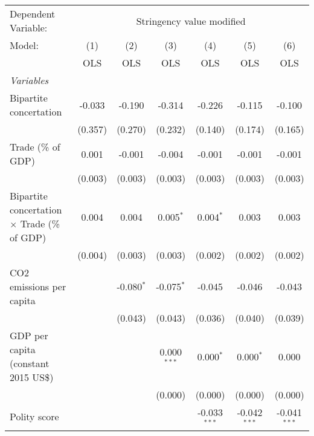 
\begingroup
\centering
\begin{tabular}{lcccccc}
   \toprule
   Dependent Variable: & \multicolumn{6}{c}{Stringency value modified}\\
   Model:                                              & (1)     & (2)          & (3)           & (4)            & (5)            & (6)\\  
                                                       &  OLS    & OLS          & OLS           & OLS            & OLS            & OLS\\  
   \midrule
   \emph{Variables}\\
   Bipartite concertation                              & -0.033  & -0.190       & -0.314        & -0.226         & -0.115         & -0.100\\   
                                                       & (0.357) & (0.270)      & (0.232)       & (0.140)        & (0.174)        & (0.165)\\   
   Trade (\% of GDP)                                   & 0.001   & -0.001       & -0.004        & -0.001         & -0.001         & -0.001\\   
                                                       & (0.003) & (0.003)      & (0.003)       & (0.003)        & (0.003)        & (0.003)\\   
   Bipartite concertation $\times$ Trade (\% of GDP)   & 0.004   & 0.004        & 0.005$^{*}$   & 0.004$^{*}$    & 0.003          & 0.003\\   
                                                       & (0.004) & (0.003)      & (0.003)       & (0.002)        & (0.002)        & (0.002)\\   
   CO2 emissions per capita                            &         & -0.080$^{*}$ & -0.075$^{*}$  & -0.045         & -0.046         & -0.043\\   
                                                       &         & (0.043)      & (0.043)       & (0.036)        & (0.040)        & (0.039)\\   
   GDP per capita (constant 2015 US\$)                 &         &              & 0.000$^{***}$ & 0.000$^{*}$    & 0.000$^{*}$    & 0.000\\   
                                                       &         &              & (0.000)       & (0.000)        & (0.000)        & (0.000)\\   
   Polity score                                        &         &              &               & -0.033$^{***}$ & -0.042$^{***}$ & -0.041$^{***}$\\   

\end{tabular}
